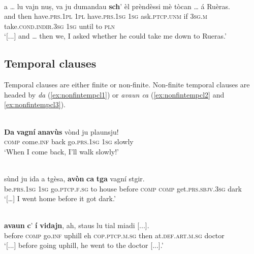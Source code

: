 \ea
\label{ex:objcscha1}
\\
\gll   [...] a … lu vajn nuṣ, va ju dumandau \textbf{sch}’ èl prèndèssi mè tòcan … á Ruèras. \\
{} and {} then have.\textsc{prs.1pl} \textsc{1pl} have.\textsc{prs.1sg}  \textsc{1sg} ask.\textsc{ptcp.unm} if \textsc{3sg.m} take.\textsc{cond.indir.3sg} \textsc{1sg} until {} to  \textsc{pln}\\
\glt `[...] and … then we, I asked whether he could take me down to Rueras.'
\z


\subsection{Temporal clauses}
Temporal clauses are either finite or non-finite. Non-finite temporal clauses are headed by \textit{da} (\ref{ex:nonfintempcl1}) or \textit{avaun ca} (\ref{ex:nonfintempcl2} and \ref{ex:nonfintempcl3}).

\ea
\label{ex:nonfintempcl1}
\\
\gll    \textbf{Da} \textbf{vagní} \textbf{anavùs} vònd ju plaunsju!\\
\textsc{comp} come.\textsc{inf} back go.\textsc{prs.1sg} \textsc{1sg} slowly \\
\glt `When I come back, I’ll walk slowly!'
\z

\ea
\label{ex:nonfintempcl2}
 {\citealt[17]{Büchli1966}}\\
\gll  [...]  sùnd ju ida a tgèsa, \textbf{avòn}\footnotemark {} \textbf{ca} \textbf{tga} vagní stgir.\\
{} be.\textsc{prs.1sg} \textsc{1sg} go.\textsc{ptcp.f.sg} to house before \textsc{comp} \textsc{comp} get.\textsc{prs.sbjv.3sg} dark \\
\glt `[…] I went home before it got dark.'
\z

\ea
\label{ex:nonfintempcl3}
\\
\gll  [...] \textbf{avaun} \textbf{c}’ \textbf{í} \textbf{vidajn}, ah, staus lu tial miadi [...]. \\
{} before \textsc{comp} go.\textsc{inf} uphill eh \textsc{cop.ptcp.m.sg} then  at.\textsc{def.art.m.sg} doctor\\
\glt `[...] before going uphill, he went to the doctor [...].'
\z

